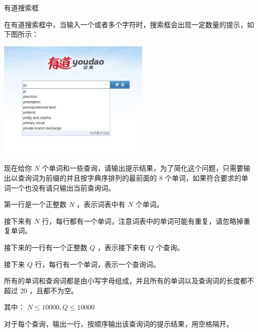 有道搜索框

在有道搜索框中，当输入一个或者多个字符时，搜索框会出现一定数量的提示，如下图所示：

\begin{center}
    \includegraphics[bb=0 0 1000 1000]{youdao.jpg}
\end{center}

现在给你 $N$ 个单词和一些查询，请输出提示结果，为了简化这个问题，只需要输出以查询词为前缀的并且按字典序排列的最前面的 $8$ 个单词，如果符合要求的单词一个也没有请只输出当前查询词。

第一行是一个正整数 $N$ ，表示词表中有 $N$ 个单词。

接下来有 $N$ 行，每行都有一个单词，注意词表中的单词可能有重复，请忽略掉重复单词。

接下来的一行有一个正整数 $Q$ ，表示接下来有 $Q$ 个查询。

接下来 $Q$ 行，每行有一个单词，表示一个查询词。

所有的单词和查询词都是由小写字母组成，并且所有的单词以及查询词的长度都不超过 20 ，且都不为空。

其中： $N \leq 10000, Q \leq 10000$

对于每个查询，输出一行，按顺序输出该查询词的提示结果，用空格隔开。
